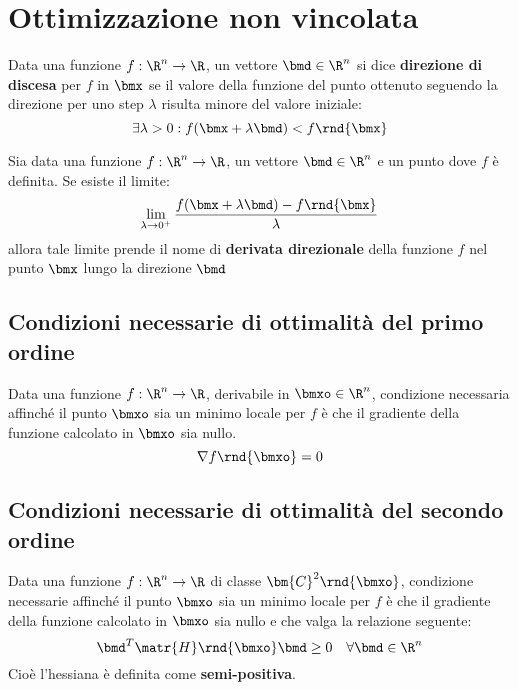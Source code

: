 \documentclass[\main/main.tex]{subfiles}
\begin{document}
\chapter{Ottimizzazione non vincolata}
\begin{definition}
    Data una funzione \(f:\R^n \rightarrow \R \), un vettore \(\bmd \in \R^n\) si dice \textbf{direzione di discesa} per \(f\) in \(\bmx \) se il valore della funzione del punto ottenuto seguendo la direzione per uno step \(\lambda \) risulta minore del valore iniziale:
    \[
        \exists \lambda > 0: f(\bmx + \lambda\bmd) < f\rnd{\bmx}
    \]\end{definition}
\begin{definition}
    Sia data una funzione \(f: \R^n \rightarrow \R \), un vettore \(\bmd \in \R^n\) e un punto dove \(f\) è definita. Se esiste il limite:
    \[
        \lim_{\lambda\rightarrow0^+} \frac{f(\bmx + \lambda\bmd) - f\rnd{\bmx}}{\lambda}
    \]    allora tale limite prende il nome di \textbf{derivata direzionale} della funzione \(f\) nel punto \(\bmx \) lungo la direzione \(\bmd \)
\end{definition}

\section{Condizioni necessarie di ottimalità del primo ordine}
\begin{theorem}
    Data una funzione \(f: \R^n \rightarrow \R \), derivabile in \(\bmxo \in \R^n\), condizione necessaria affinché il punto \(\bmxo \) sia un minimo locale per \(f\) è che il gradiente della funzione calcolato in \(\bmxo \) sia nullo.
    \[
        \nabla f\rnd{\bmxo} = 0
    \]\end{theorem}
\section{Condizioni necessarie di ottimalità del secondo ordine}
\begin{theorem}
    Data una funzione \(f: \R^n \rightarrow \R \) di classe \(\bm{C}^2\rnd{\bmxo}\), condizione necessarie affinché il punto \(\bmxo \) sia un minimo locale per \(f\) è che il gradiente della funzione calcolato in \(\bmxo \) sia nullo e che valga la relazione seguente:
    \[
        \bmd^T \matr{H} \rnd{\bmxo}\bmd \geq 0 \quad \forall \bmd \in \R^n
    \]    Cioè l'hessiana è definita come \textbf{semi-positiva}.
\end{theorem}
\end{document}
